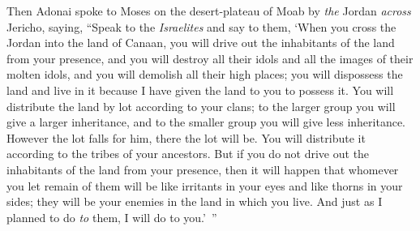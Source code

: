 \begin{biblechapter}
\verse Then Adonai spoke to Moses on the desert-plateau of Moab by \textit{the} Jordan \textit{across} Jericho, saying,
\verse “Speak to the \textit{Israelites} and say to them, ‘When you cross the Jordan into the land of Canaan,
\verse you will drive out the inhabitants of the land from your presence, and you will destroy all their idols and all the images of their molten idols, and you will demolish all their high places;
\verse you will dispossess the land and live in it because I have given the land to you to possess it.
\verse You will distribute the land by lot according to your clans; to the larger group you will give a larger inheritance, and to the smaller group you will give less inheritance. However the lot falls for him, there the lot will be. You will distribute it according to the tribes of your ancestors.
\verse But if you do not drive out the inhabitants of the land from your presence, then it will happen that whomever you let remain of them will be like irritants in your eyes and like thorns in your sides; they will be your enemies in the land in which you live.
\verse And just as I planned to do \textit{to} them, I will do to you.’ ”
\end{biblechapter}

